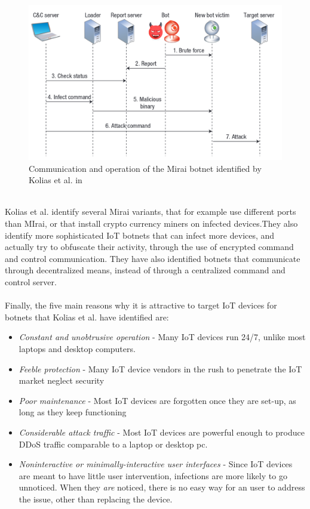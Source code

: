 \documentclass[a4paper,10pt]{article}
\begin{document}
\begin{figure}[hbtp]
 \centering
 \includegraphics[width=0.8\linewidth]{kolias.png}
 \caption{Communication and operation of the Mirai botnet identified by Kolias et al. in \cite{Kolias2017}}
 \label{fig:kolias_communication}
\end{figure}
~\\
Kolias et al. identify several Mirai variants, that for example use different ports than MIrai, or that install crypto currency
miners on infected devices.They also identify more sophisticated IoT botnets that can infect more devices, and actually
try to obfuscate their activity, through the use of encrypted command and control communication. They have also 
identified botnets that communicate through decentralized means, instead of through a centralized command and 
control server.
\\\\
Finally, the five main reasons why it is attractive to target IoT devices for botnets that Kolias et al. have identified are:
\begin{itemize}
 \item \textit{Constant and unobtrusive operation} - Many IoT devices run 24/7, unlike most laptops and desktop 
 computers.
 \item \textit{Feeble protection} - Many IoT device vendors in the rush to penetrate the IoT market neglect security
 \item \textit{Poor maintenance} - Most IoT devices are forgotten once they are set-up, as long as they keep functioning
 \item \textit{Considerable attack traffic} - Most IoT devices are powerful enough to produce DDoS traffic comparable 
 to a laptop or desktop pc.
 \item \textit{Noninteractive or minimally-interactive user interfaces} - Since IoT devices are meant to have little user 
 intervention, infections are more likely to go unnoticed. When they \textit{are} noticed, there is no easy way for an user
 to address the issue, other than replacing the device.
\end{itemize}
\end{document}
